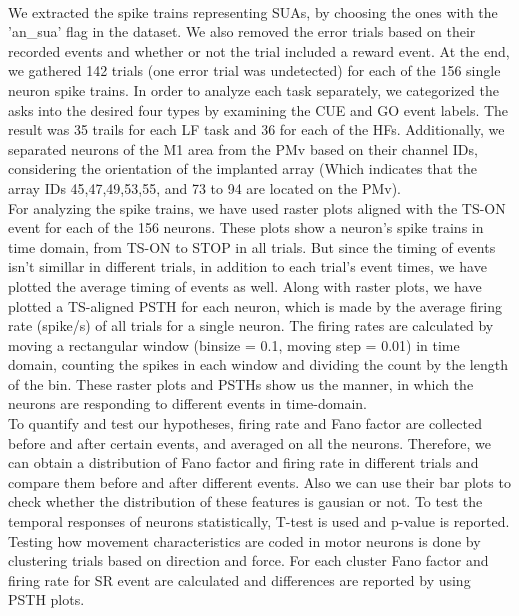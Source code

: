 \documentclass[9pt,twocolumn]{paper-template}
\begin{document}
\\
We extracted the spike trains representing SUAs, by choosing the ones with the 'an\_sua' flag in the dataset. We also removed the error trials based on their recorded events and whether or not the trial included a reward event. At the end, we gathered 142 trials (one error trial was undetected) for each of the 156 single neuron spike trains. In order to analyze each task separately, we categorized the asks into the desired four types by examining the CUE and GO event labels. The result was 35 trails for each LF task and 36 for each of the HFs. Additionally, we separated neurons of the M1 area from the PMv based on their channel IDs, considering the orientation of the implanted array (Which indicates that the array IDs 45,47,49,53,55, and 73 to 94 are located on the PMv).
\\
For analyzing the spike trains, we have used raster plots aligned with the TS-ON event for each of the 156 neurons. These plots show a neuron's spike trains in time domain, from TS-ON to STOP in all trials. But since the timing of events isn't simillar in different trials, in addition to each trial's event times, we have plotted the average timing of events as well.
Along with raster plots, we have plotted a TS-aligned PSTH for each neuron, which is made by the average firing rate (spike/s) of all trials for a single neuron. The firing rates are calculated by moving a rectangular window (binsize = 0.1, moving step = 0.01) in time domain, counting the spikes in each window and dividing the count by the length of the bin.
These raster plots and PSTHs show us the manner, in which the neurons are responding to different events in time-domain.
\\
To quantify and test our hypotheses, firing rate and Fano factor are collected before and after certain events, and averaged on all the neurons. Therefore, we can obtain a distribution of Fano factor and firing rate in different trials and compare them before and after different events. Also we can use their bar plots to check whether the distribution of these features is gausian or not. To test the temporal responses of neurons statistically, T-test is used and p-value is reported. Testing how movement characteristics are coded in motor neurons is done by clustering trials based on direction and force. For each cluster Fano factor and firing rate for SR event are calculated and differences are reported by using PSTH plots.
\end{document}
